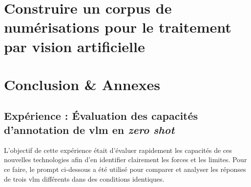 \documentclass[12pt,twoside]{book}
\begin{document}





\part{Construire un corpus de numérisations pour le traitement par  vision artificielle}

	




%
	
\part{Conclusion \& Annexes}



\newpage{\pagestyle{empty}\cleardoublepage}



\appendix %



\chapter[Annexes : Expériences]{Expérience : Évaluation des capacités d'annotation de \gls{vlm} en \textit{zero shot}}

L'objectif de cette expérience était d'évaluer rapidement les capacités de ces nouvelles technologies afin d'en identifier clairement les forces et les limites. Pour ce faire, le prompt ci-dessous a été utilisé pour comparer et analyser les réponses de trois \gls{vlm} différents dans des conditions identiques.
\end{document}
